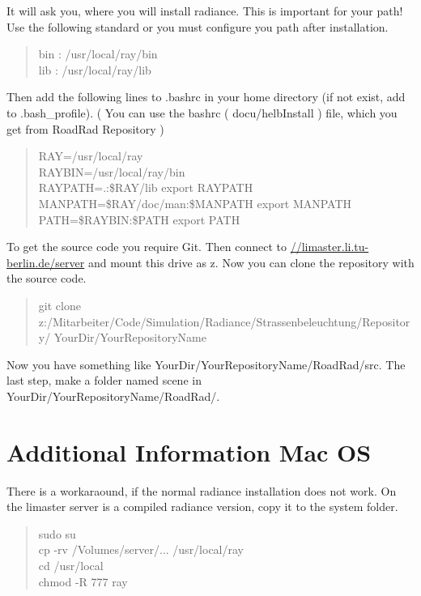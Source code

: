 \documentclass[10pt,a4paper]{report}
\begin{document}
It will ask you, where you will install radiance. This is important for your path!
Use the following standard or you must configure you path after installation.
\begin{quote}
bin : /usr/local/ray/bin\\
lib : /usr/local/ray/lib
\end{quote}

Then add the following lines to .bashrc in your home directory (if not exist, add to .bash\_profile). ( You can use the bashrc ( docu/helbInstall ) file, which you get from RoadRad Repository )

\begin{quote}
RAY=/usr/local/ray\\
RAYBIN=/usr/local/ray/bin\\
RAYPATH=.:\$RAY/lib export RAYPATH\\
MANPATH=\$RAY/doc/man:\$MANPATH export MANPATH\\
PATH=\$RAYBIN:\$PATH export PATH
\end{quote}

To get the source code you require Git. Then connect to \url{//limaster.li.tu-berlin.de/server} and
mount this drive as \glqq z\grqq. Now you can clone the repository with the source code.

\begin{quote}
git clone \\
z:/Mitarbeiter/Code/Simulation/Radiance/Strassenbeleuchtung/Repository/ YourDir/YourRepositoryName
\end{quote}

Now you have something like \glqq YourDir/YourRepositoryName/RoadRad/src\grqq. The last step, make a folder named scene in \glqq YourDir/YourRepositoryName/RoadRad/\grqq.

\section{Additional Information Mac OS}
There is a workaraound, if the normal radiance installation does not work. On the limaster server is a compiled radiance version, copy it to the system folder.

\begin{quote}
sudo su\\
cp -rv /Volumes/server/... /usr/local/ray\\
cd /usr/local\\
chmod -R 777 ray
\end{quote}
\end{document}
